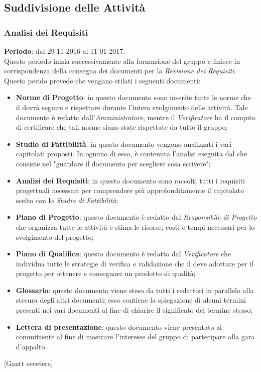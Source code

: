 \subsection{Suddivisione delle Attività}
	\subsubsection{Analisi dei Requisiti}
	\textbf{Periodo}: dal 29-11-2016 al 11-01-2017.
	\\ Questo periodo inizia successivamente alla formazione del gruppo e finisce in corrispondenza della consegna dei documenti per la \textit{Revisione dei Requisiti}.
	Questo perido prevede che vengano stilati i seguenti documenti:
	\begin{itemize}
		\item \textbf{Norme di Progetto}: in questo documento sono inserite tutte le norme che il  dovrà seguire e rispettare durante l'intero
		svolgimento delle attività. Tale documento è redatto dall'\textit{Amministratore}, mentre il \textit{Verificatore} ha il compito di certificare che 
		tali norme siano state rispettate da tutto il gruppo;
		\item \textbf{Studio di Fattibilità}: in questo documento vengono analizzati i vari capitolati proposti. In ognuno di esso, è contenuta l'analisi
		eseguita dal  che consiste nel "guardare il documento per scegliere cosa scrivere";
		\item \textbf{Analisi dei Requisiti}: in questo documento sono raccolti tutti i requisiti progettuali necessari per comprendere più approfonditamente
		il capitolato scelto con lo \textit{Studio di Fattibilità};
		\item \textbf{Piano di Progetto}: questo documento è redatto dal \textit{Responsibile di Progetto} che organizza tutte le attività e stima le risorse,
		costi e tempi necessari	per lo svolgimento del progetto;
		\item \textbf{Piano di Qualifica}: questo documento è redatto dal \textit{Verificatore} che individua tutte le strategie di verifica e validazione che
		il  deve adottare per il progetto per ottenere e consegnare un prodotto di qualità;
		\item \textbf{Glossario}: questo documento viene steso da tutti i redattori in parallelo alla stesura degli altri documenti; esso contiene la 
		spiegazione di alcuni termini presenti nei vari documenti al fine di chiarire il significato del termine stesso;
		\item \textbf{Lettera di presentazione}: questo documento viene presentato al committente al fine di mostrare l'interesse del gruppo di partecipare
		alla gara d'appalto.
	\end{itemize}
	[Gantt eccetera]
